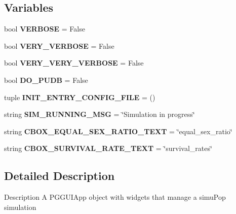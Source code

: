 \subsection*{Variables}
\begin{DoxyCompactItemize}
\item 
bool {\bfseries V\+E\+R\+B\+O\+SE} = False\hypertarget{namespacenegui_1_1pgguisimupop__experimental2_a56f592c56d805d1aa2fe1532ce72ec83}{}\label{namespacenegui_1_1pgguisimupop__experimental2_a56f592c56d805d1aa2fe1532ce72ec83}

\item 
bool {\bfseries V\+E\+R\+Y\+\_\+\+V\+E\+R\+B\+O\+SE} = False\hypertarget{namespacenegui_1_1pgguisimupop__experimental2_a82c3d0075a391e7888f995337cfd8844}{}\label{namespacenegui_1_1pgguisimupop__experimental2_a82c3d0075a391e7888f995337cfd8844}

\item 
bool {\bfseries V\+E\+R\+Y\+\_\+\+V\+E\+R\+Y\+\_\+\+V\+E\+R\+B\+O\+SE} = False\hypertarget{namespacenegui_1_1pgguisimupop__experimental2_acfc626035f511feda0e5629dbc59186a}{}\label{namespacenegui_1_1pgguisimupop__experimental2_acfc626035f511feda0e5629dbc59186a}

\item 
bool {\bfseries D\+O\+\_\+\+P\+U\+DB} = False\hypertarget{namespacenegui_1_1pgguisimupop__experimental2_a8f5887624b125e44722a53ddaef689ea}{}\label{namespacenegui_1_1pgguisimupop__experimental2_a8f5887624b125e44722a53ddaef689ea}

\item 
tuple {\bfseries I\+N\+I\+T\+\_\+\+E\+N\+T\+R\+Y\+\_\+\+C\+O\+N\+F\+I\+G\+\_\+\+F\+I\+LE} = ()\hypertarget{namespacenegui_1_1pgguisimupop__experimental2_a1197dabf3f4a27269acc2e71c2912696}{}\label{namespacenegui_1_1pgguisimupop__experimental2_a1197dabf3f4a27269acc2e71c2912696}

\item 
string {\bfseries S\+I\+M\+\_\+\+R\+U\+N\+N\+I\+N\+G\+\_\+\+M\+SG} = \char`\"{}Simulation in progress\char`\"{}\hypertarget{namespacenegui_1_1pgguisimupop__experimental2_a4f07b8ab24064fe8b31cd83e0c6fc66d}{}\label{namespacenegui_1_1pgguisimupop__experimental2_a4f07b8ab24064fe8b31cd83e0c6fc66d}

\item 
string {\bfseries C\+B\+O\+X\+\_\+\+E\+Q\+U\+A\+L\+\_\+\+S\+E\+X\+\_\+\+R\+A\+T\+I\+O\+\_\+\+T\+E\+XT} = \char`\"{}equal\+\_\+sex\+\_\+ratio\char`\"{}\hypertarget{namespacenegui_1_1pgguisimupop__experimental2_acc381ca5686492149750b4bfa7587ae3}{}\label{namespacenegui_1_1pgguisimupop__experimental2_acc381ca5686492149750b4bfa7587ae3}

\item 
string {\bfseries C\+B\+O\+X\+\_\+\+S\+U\+R\+V\+I\+V\+A\+L\+\_\+\+R\+A\+T\+E\+\_\+\+T\+E\+XT} = \char`\"{}survival\+\_\+rates\char`\"{}\hypertarget{namespacenegui_1_1pgguisimupop__experimental2_a8044916da76222db2b7ab6a22e7e6744}{}\label{namespacenegui_1_1pgguisimupop__experimental2_a8044916da76222db2b7ab6a22e7e6744}

\end{DoxyCompactItemize}


\subsection{Detailed Description}
\begin{DoxyVerb}Description
A PGGUIApp object with widgets that manage a simuPop simulation
\end{DoxyVerb}
 
